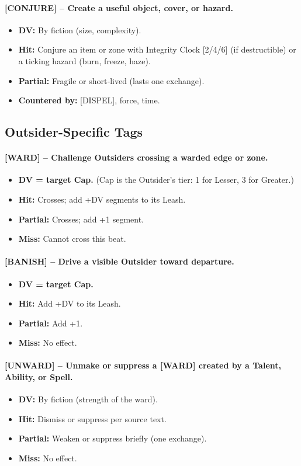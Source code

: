 \paragraph{[CONJURE] – Create a useful object, cover, or hazard.}
\begin{itemize}
  \item \textbf{DV:} By fiction (size, complexity).
  \item \textbf{Hit:} Conjure an item or zone with Integrity Clock [2/4/6] (if destructible) or a ticking hazard (burn, freeze, haze).
  \item \textbf{Partial:} Fragile or short‑lived (lasts one exchange).
  \item \textbf{Countered by:} [DISPEL], force, time.
\end{itemize}

\subsection{Outsider‑Specific Tags}
\label{sec:tags-outsiders}

\paragraph{[WARD] – Challenge Outsiders crossing a warded edge or zone.}
\begin{itemize}
  \item \textbf{DV = target Cap.} (Cap is the Outsider's tier: 1 for Lesser, 3 for Greater.)
  \item \textbf{Hit:} Crosses; add +DV segments to its Leash.
  \item \textbf{Partial:} Crosses; add +1 segment.
  \item \textbf{Miss:} Cannot cross this beat.
\end{itemize}

\paragraph{[BANISH] – Drive a visible Outsider toward departure.}
\begin{itemize}
  \item \textbf{DV = target Cap.}
  \item \textbf{Hit:} Add +DV to its Leash.
  \item \textbf{Partial:} Add +1.
  \item \textbf{Miss:} No effect.
\end{itemize}

\paragraph{[UNWARD] – Unmake or suppress a [WARD] created by a Talent, Ability, or Spell.}
\begin{itemize}
  \item \textbf{DV:} By fiction (strength of the ward).
  \item \textbf{Hit:} Dismiss or suppress per source text.
  \item \textbf{Partial:} Weaken or suppress briefly (one exchange).
  \item \textbf{Miss:} No effect.
\end{itemize}

